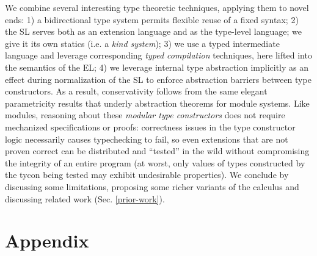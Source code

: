 \documentclass{llncs}
\begin{document}
We combine several interesting type theoretic techniques, applying them to novel ends: 1)  a bidirectional type system permits flexible reuse of a fixed syntax; 2) the SL serves both as an extension language and as the type-level language; we give it its own statics (i.e. a \emph{kind system}); 3) we use a typed intermediate language and leverage corresponding \emph{typed compilation} techniques, here lifted into the semantics of the EL; 4) we leverage internal type abstraction implicitly as an effect during normalization of the SL to enforce abstraction barriers between type constructors. 
As a result, conservativity follows from the same elegant parametricity results that underly  abstraction theorems for module systems. 
Like modules, reasoning about these \emph{modular type constructors} does not require  mechanized specifications or proofs: correctness issues in the type constructor logic necessarily causes typechecking to fail, so even extensions that are not proven correct can be distributed and ``tested'' in the wild without compromising the integrity of an entire program (at worst, only values of types constructed by the tycon being tested may exhibit undesirable properties). 
We conclude by discussing some limitations, proposing some richer variants of the calculus and discussing related work (Sec. \ref{prior-work}). %




\appendix
\section{Appendix}
\end{document}
